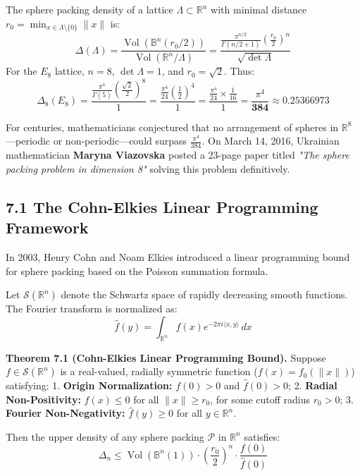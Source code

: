 \documentclass[11pt,twoside,openright]{amsbook}
\begin{document}
The sphere packing density of a lattice $\Lambda \subset \mathbb{R}^n$ with minimal distance $r_0 = \min_{x \in \Lambda \setminus \{0\}} \|x\|$ is:
$$\Delta(\Lambda) = \frac{\operatorname{Vol}\left(\mathbb{B}^n(r_0/2)\right)}{\operatorname{Vol}(\mathbb{R}^n / \Lambda)} = \frac{\frac{\pi^{n/2}}{\Gamma(n/2 + 1)} \left(\frac{r_0}{2}\right)^n}{\sqrt{\det \Lambda}}$$
For the $E_8$ lattice, $n = 8$, $\det \Lambda = 1$, and $r_0 = \sqrt{2}$. Thus:
$$\Delta_8(E_8) = \frac{\frac{\pi^4}{\Gamma(5)} \left(\frac{\sqrt{2}}{2}\right)^8}{1} = \frac{\frac{\pi^4}{24} \left(\frac{1}{2}\right)^4}{1} = \frac{\frac{\pi^4}{24} \times \frac{1}{16}}{1} = \frac{\pi^4}{\mathbf{384}} \approx \mathbf{0.25366973}$$

For centuries, mathematicians conjectured that no arrangement of spheres in $\mathbb{R}^8$—periodic or non-periodic—could surpass $\frac{\pi^4}{384}$. On March 14, 2016, Ukrainian mathematician \textbf{Maryna Viazovska} posted a 23-page paper titled \textit{"The sphere packing problem in dimension 8"} solving this problem definitively.

\subsection{7.1 The Cohn-Elkies Linear Programming Framework}

In 2003, Henry Cohn and Noam Elkies introduced a linear programming bound for sphere packing based on the Poisson summation formula.

Let $\mathcal{S}(\mathbb{R}^n)$ denote the Schwartz space of rapidly decreasing smooth functions. The Fourier transform is normalized as:
$$\widehat{f}(y) = \int_{\mathbb{R}^n} f(x) e^{-2\pi i \langle x, y \rangle} \, dx$$

\textbf{Theorem 7.1 (Cohn-Elkies Linear Programming Bound).} Suppose $f \in \mathcal{S}(\mathbb{R}^n)$ is a real-valued, radially symmetric function ($f(x) = f_0(\|x\|)$) satisfying:
1. \textbf{Origin Normalization:} $f(0) > 0$ and $\widehat{f}(0) > 0$;
2. \textbf{Radial Non-Positivity:} $f(x) \le 0$ for all $\|x\| \ge r_0$, for some cutoff radius $r_0 > 0$;
3. \textbf{Fourier Non-Negativity:} $\widehat{f}(y) \ge 0$ for all $y \in \mathbb{R}^n$.

Then the upper density of any sphere packing $\mathcal{P}$ in $\mathbb{R}^n$ satisfies:
$$\Delta_n \le \operatorname{Vol}\left(\mathbb{B}^n(1)\right) \cdot \left(\frac{r_0}{2}\right)^n \cdot \frac{f(0)}{\widehat{f}(0)}$$
\end{document}
